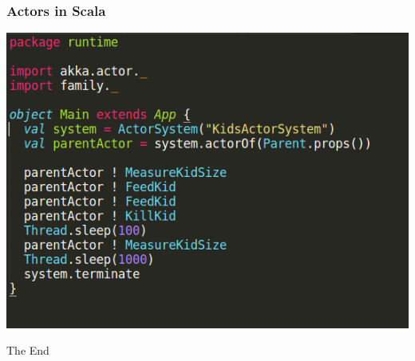 \documentclass{beamer}
\begin{document}

\begin{frame}
\frametitle{Actors in Scala}
\includegraphics[width=0.8\linewidth]{./parent_main.png}
\end{frame}



\begin{frame}
\Huge{\centerline{The End}}
\end{frame}

\end{document}
